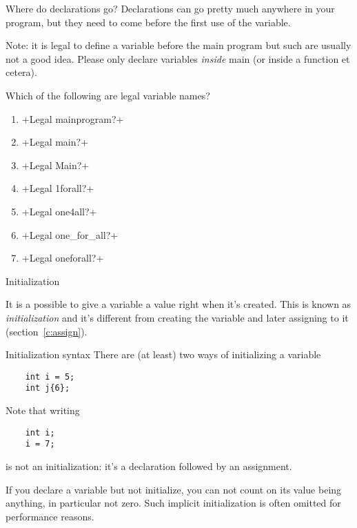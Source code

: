 \begin{block}{Where do declarations go?}
  \label{sl:declwhere}
  Declarations can go pretty much anywhere in your program, but they need
  to come before the first use of the variable.

  Note: it is legal to define a variable before the main program
  but such  are usually not a good idea.
  Please only declare variables \emph{inside} main
  (or inside a function et cetera).
\end{block}

\begin{review}
  \label{q:varnames}
  Which of the following are legal variable names?
  \begin{enumerate}
  \item {}
    \slackpollTF+Legal mainprogram?+
  \item {}
    \slackpollTF+Legal main?+
  \item {}
    \slackpollTF+Legal Main?+
  \item {}
    \slackpollTF+Legal 1forall?+
  \item {}
    \slackpollTF+Legal one4all?+
  \item {}
    \slackpollTF+Legal one_for_all?+
  \item {}
    \slackpollTF+Legal onefor{all}?+
  \end{enumerate}
\end{review}

 {Initialization}
\label{sec:varinit}

It is a possible to give a variable a value right when it's
created. This is known as
\emph{initialization} and it's
different from creating the variable and later assigning to it
(section~\ref{c:assign}).

\begin{block}{Initialization syntax}
  \label{sl:init-var}
  There are (at least) two ways of initializing a variable
  \begin{lstlisting}
    int i = 5;
    int j{6};
  \end{lstlisting}
  Note that writing 
  \begin{lstlisting}
    int i;
    i = 7;
  \end{lstlisting}
  is not an initialization: it's a declaration followed by an
  assignment.

  If you declare a variable but not initialize, you can not count on
  its value being anything, in particular not zero. Such implicit initialization is
  often omitted for performance reasons.
\end{block}

